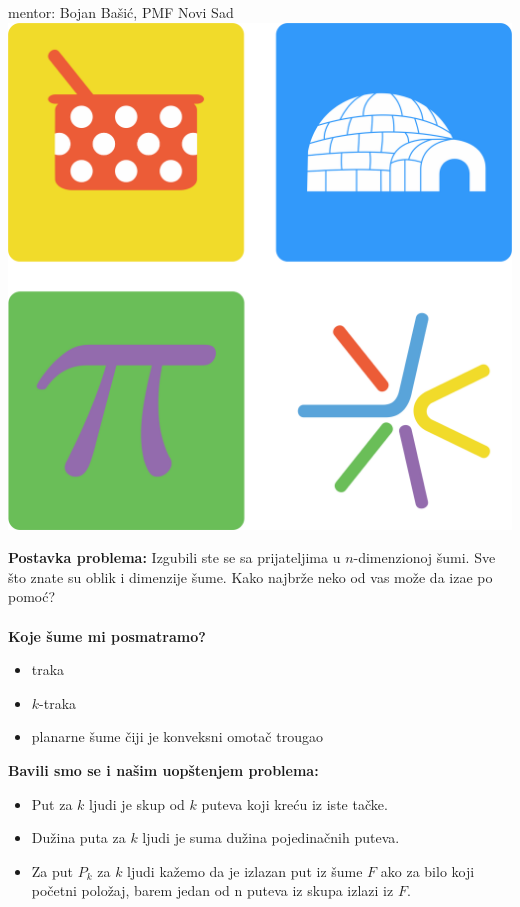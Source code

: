 \documentclass[b1paper,portrait]{template/baposter}
\begin{document}
\begin{poster}
{{		   	mentor: Bojan Ba\v si\' c, PMF Novi Sad
		}
}
{\includegraphics[scale=0.25]{MatLogo}}




{ 
	\textbf{Postavka problema:}
 	Izgubili ste se sa prijateljima u $n$-dimenzionoj \v sumi.
 	Sve \v sto znate su oblik i dimenzije \v sume.
 	Kako najbr\v ze neko od vas mo\v ze da iza\dj e po pomo\' c?
 	\\
 	\\
 	\textbf{Koje \v sume mi posmatramo?}
 	\begin{itemize}
 		\item traka
 		\item $k$-traka
 		\item planarne \v sume \v ciji je konveksni omota\v c trougao
 	\end{itemize}
	\textbf{Bavili smo se i na\v sim uop\v stenjem problema:}
	\begin{itemize}
		\item Put za $k$ ljudi je skup od $k$ puteva koji kre\' cu iz iste ta\v cke.
		\item Du\v zina puta za $k$ ljudi je suma du\v zina pojedina\v cnih puteva.
		\item Za put $P_k$ za $k$ ljudi ka\v zemo da je izlazan put iz \v sume $F$ ako za bilo koji po\v cetni polo\v zaj, barem jedan od n puteva iz skupa izlazi iz $F$.
	\end{itemize}
   	\vspace{0.15cm}
}


\end{poster}
\end{document}
